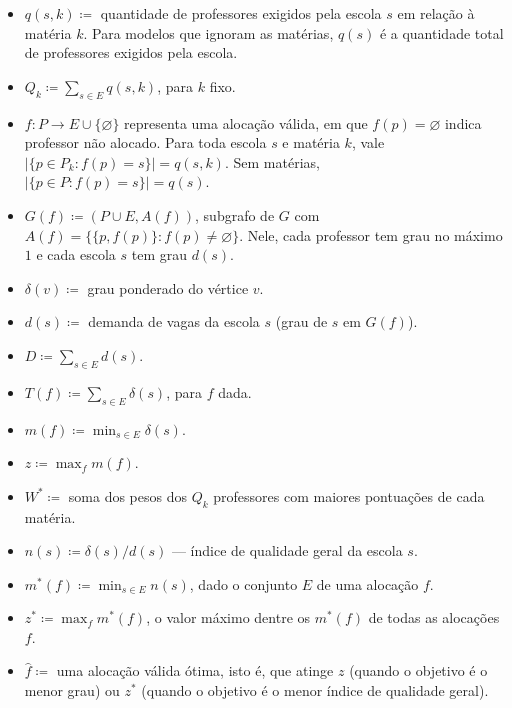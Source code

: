 \documentclass[12pt,a4paper]{article}
\begin{document}
\begin{itemize}
  \item $q(s,k) \coloneqq$ quantidade de professores exigidos pela escola $s$
  em relação à matéria $k$. Para modelos que ignoram as matérias, $q(s)$ é a
  quantidade total de professores exigidos pela escola.

  \item $Q_k \coloneqq \displaystyle\sum_{s \in E} q(s,k)$, para $k$ fixo.

  \item $f \colon P \to E \cup \{\varnothing\}$ representa uma alocação válida,
  em que $f(p) = \varnothing$ indica professor não alocado. Para toda escola
  $s$ e matéria $k$, vale $|\{p \in P_k : f(p) = s\}| = q(s,k)$. Sem matérias,
  $|\{p \in P : f(p) = s\}| = q(s)$.

  \item $G(f) \coloneqq (P \cup E, A(f))$, subgrafo de $G$ com
  $A(f) = \{\{p, f(p)\} : f(p) \neq \varnothing\}$. Nele, cada professor tem
  grau no máximo $1$ e cada escola $s$ tem grau $d(s)$.

  \item $\delta(v) \coloneqq$ grau ponderado do vértice $v$.

  \item $d(s) \coloneqq$ demanda de vagas da escola $s$ (grau de $s$ em $G(f)$).

  \item $D \coloneqq \displaystyle\sum_{s \in E} d(s)$.

  \item $T(f) \coloneqq \displaystyle\sum_{s \in E} \delta(s)$, para $f$ dada.

  \item $m(f) \coloneqq \displaystyle\min_{s \in E} \delta(s)$.

  \item $z \coloneqq \displaystyle\max_{f} m(f)$.

  \item $W^* \coloneqq$ soma dos pesos dos $Q_k$ professores com maiores pontuações de cada matéria.
  \item $n(s) \coloneqq \delta(s)/d(s)$ --- índice de qualidade geral da escola $s$.
  \item $m^*(f) \coloneqq \displaystyle\min_{s \in E} n(s)$, dado o conjunto $E$ de uma alocação $f$.
  \item $z^* \coloneqq \displaystyle\max_{f} m^*(f)$, o valor máximo dentre os $m^*(f)$ de todas as alocações $f$.
  \item $\hat{f} \coloneqq$ uma alocação válida ótima, isto é, que atinge $z$ (quando o objetivo é o menor grau) ou $z^*$ (quando o objetivo é o menor índice de qualidade geral).
\end{itemize}
\end{document}
